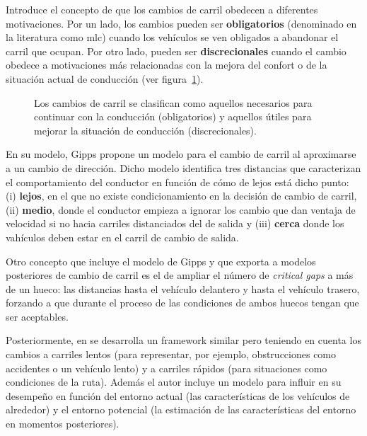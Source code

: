 Introduce el concepto de que los cambios de carril obedecen a diferentes motivaciones. Por un lado, los cambios pueden ser \textbf{obligatorios} (denominado en la literatura como \gls{mlc}) cuando los vehículos se ven obligados a abandonar el carril que ocupan. Por otro lado, pueden ser \textbf{discrecionales} cuando el cambio obedece a motivaciones más relacionadas con la mejora del confort o de la situación actual de conducción (ver figura~\ref{fig:lane-change-mandatory-vs-discretional}).

\begin{figure}[t]
	\caption[Ejemplo de cambio de carril obligatorio frente a cambio de carril discrecional]{Los cambios de carril se clasifican como aquellos necesarios para continuar con la conducción (obligatorios) y aquellos útiles para mejorar la situación de conducción (discrecionales).}
	\label{fig:lane-change-mandatory-vs-discretional}
\end{figure}

En su modelo, Gipps propone un modelo para el cambio de carril al aproximarse a un cambio de dirección. Dicho modelo identifica tres distancias que caracterizan el comportamiento del conductor en función de cómo de lejos está dicho punto: (i) \textbf{lejos}, en el que no existe condicionamiento en la decisión de cambio de carril, (ii) \textbf{medio}, donde el conductor empieza a ignorar los cambio que dan ventaja de velocidad si no hacia carriles distanciados del de salida y (iii) \textbf{cerca} donde los vahículos deben estar en el carril de cambio de salida.

Otro concepto que incluye el modelo de Gipps y que exporta a modelos posteriores de cambio de carril es el de ampliar el número de \textit{critical gaps} a más de un hueco: las distancias hasta el vehículo delantero y hasta el vehículo trasero, forzando a que durante el proceso de \textit{} las condiciones de ambos huecos tengan que ser aceptables.

Posteriormente, en \cite{wiedemann1992microscopic} se desarrolla un framework similar pero teniendo en cuenta los cambios a carriles lentos (para representar, por ejemplo, obstrucciones como accidentes o un vehículo lento) y a carriles rápidos (para situaciones como condiciones de la ruta). Además el autor incluye un modelo para influir en su desempeño en función del entorno actual (las características de los vehículos de alrededor) y el entorno potencial (la estimación de las características del entorno en momentos posteriores).

